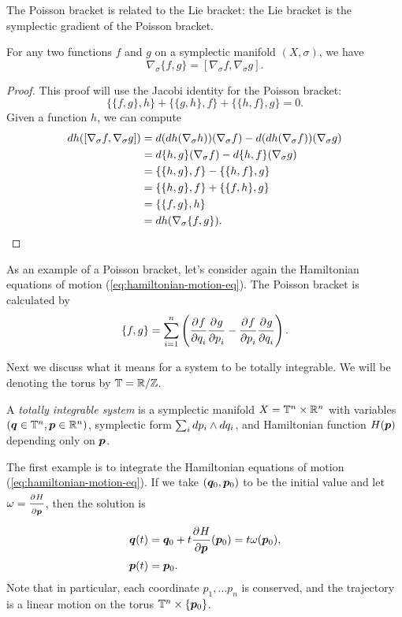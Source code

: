 \documentclass[twoside,letterpaper,10pt]{article}
\newcommand{\sgrad}{\nabla_{\sigma}}
\numberwithin{equation}{section}
\newcommand{\T}{\mathbb{T}}
\begin{document}
The Poisson bracket is related to the Lie bracket:
the Lie bracket is the symplectic gradient of the Poisson bracket.
\begin{prop}
  For any two functions $f$ and $g$ on a symplectic manifold $(X, \sigma)$, we
  have
  \begin{equation*}
    \sgrad \{f, g\} = [\sgrad f, \sgrad g].
  \end{equation*} 
\end{prop}
\begin{proof}
  This proof will use the Jacobi identity for the Poisson bracket:
  \begin{equation*}
    \{\{f, g\}, h\} + \{\{g, h\}, f\} + \{\{h, f\}, g\} = 0.
  \end{equation*}
  Given a function $h$, we can compute
  \begin{align*}
    \dif h([\sgrad f, \sgrad g]) &= \dif (\dif h (\sgrad h)) (\sgrad f) - \dif
                                   (\dif h (\sgrad f)) (\sgrad g)\\
                                 &= \dif \{h, g\} (\sgrad f) - \dif \{h, f\}
                       (\sgrad g)\\
                                 &= \{ \{h, g\}, f\} - \{ \{ h, f\}, g\}\\
                                 &= \{\{h, g\}, f\} + \{\{f, h\}, g\}\\
                                 &= \{\{f, g\}, h\}\\
                                 &= \dif h (\sgrad \{f, g\}).
  \end{align*}
\end{proof}
As an example of a Poisson bracket, let's consider again the Hamiltonian
equations of motion (\cref{eq:hamiltonian-motion-eq}).
The Poisson bracket is calculated by
\begin{equation*}
  \{f, g\} = \sum_{i=1}^n \left( \frac{\strut\partial^{}f}{\strut\partial q_i^{}} \frac{\strut\partial^{}g}{\strut\partial p_i^{}} - \frac{\strut\partial^{}f}{\strut\partial p_i^{}}
    \frac{\strut\partial^{}g}{\strut\partial q_i^{}} \right).
\end{equation*}

Next we discuss what it means for a system to be totally integrable.
We will be denoting the torus by $\T = \R / \Z$.
\begin{defn}
  A \emph{totally integrable system} is a symplectic manifold $X = \T^n \times
  \R^n$ with variables $(\bp{q} \in \T^n, \bp{p} \in \R^n)$, symplectic form
  $\sum_i \mathop{}\!d p_i \wedge \mathop{}\!d q_i$, and Hamiltonian function $H(\bm{p})$
  depending only on $\bm{p}$.
\end{defn}
The first example is to integrate the Hamiltonian equations of motion
(\cref{eq:hamiltonian-motion-eq}).
If we take $(\bm{q}_0, \bm{p}_0)$ to be the initial value and let $\omega =
\frac{\strut\partial^{}H}{\strut\partial\bm{p}^{}}$, then the solution is 
\begin{align*}
  \bm{q}(t) &= \bm{q}_0 + t \frac{\strut\partial^{}H}{\strut\partial\bm{p}^{}}(\bm{p}_0) = t \omega(\bm{p}_0),\\
  \bm{p}(t) &= \bm{p}_0.
\end{align*}
Note that in particular, each coordinate $p_1, \ldots p_n$ is conserved, and the
trajectory is a linear motion on the torus $\T^n \times \{\bp{p}_0\}$.
\end{document}
